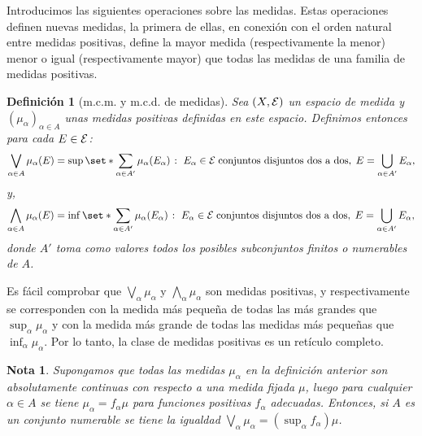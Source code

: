 \documentclass[a4paper,11pt,spanish, twoside, leqno]{tfm-uam}
\newtheorem{defi}[teo]{Definición}
\newtheorem{nota}[teo]{Nota}
\begin{document}
Introducimos las siguientes operaciones sobre las medidas. Estas operaciones definen nuevas medidas, la primera de ellas, en conexión con el orden natural entre medidas positivas, define la mayor medida (respectivamente la menor) menor o igual (respectivamente mayor) que todas las medidas de una familia de medidas positivas. 
\begin{defi}[m.c.m. y m.c.d. de medidas]  
Sea $(X, \mathcal{E})$ un espacio de medida y $(\mu_{\alpha})_{\alpha\in A}$ unas medidas positivas definidas en este espacio. Definimos entonces para cada $E\in \mathcal{E}$:
\begin{align*}
\bigvee_{\alpha\in A}\mu_{\alpha}(E)=\sup\set*{\sum_{\alpha\in A'}\mu_{\alpha}(E_{\alpha})\given E_{\alpha}\in \E \;\text{conjuntos disjuntos dos a dos},\; E=\bigcup_{\alpha\in A'}E_{\alpha}},
\end{align*}
y,
\begin{align*}
\bigwedge_{\alpha\in A}\mu_{\alpha}(E)=\inf\set*{\sum_{\alpha\in A'}\mu_{\alpha}(E_{\alpha})\given E_{\alpha}\in \E \;\text{conjuntos disjuntos dos a dos},\; E=\bigcup_{\alpha\in A'}E_{\alpha}},
\end{align*}
donde $A'$ toma como valores todos los posibles subconjuntos finitos o numerables de $A$.
\end{defi}
Es fácil comprobar que $\bigvee_{\alpha}\mu_{\alpha}$ y $\bigwedge_{\alpha}\mu_{\alpha}$ son medidas positivas, y respectivamente se corresponden con la medida más pequeña de todas las más grandes que $\sup_{\alpha} \mu_{\alpha}$ y con la medida más grande de todas las medidas más pequeñas que $\inf_{\alpha}\mu_{\alpha}$. Por lo tanto, la clase de medidas positivas es un retículo completo.

\begin{nota}\label{nota:sobre m.c.m y m.c.d medidas}
Supongamos que todas las medidas $\mu_{\alpha}$ en la definición anterior son absolutamente continuas con respecto a una medida fijada $\mu$, luego para cualquier $\alpha\in A$ se tiene $\mu_{\alpha}=f_{\alpha}\mu$ para funciones positivas $f_{\alpha}$ adecuadas. Entonces, si $A$ es un conjunto numerable se tiene la igualdad $\bigvee_{\alpha}\mu_{\alpha}=(\sup_{\alpha}f_{\alpha})\mu$.
\end{nota}
\end{document}
